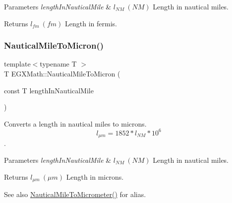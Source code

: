\begin{DoxyParams}{Parameters}
{\em length\+In\+Nautical\+Mile} & $ l_{NM}\ (NM)$ Length in nautical miles. \\
\hline
\end{DoxyParams}
\begin{DoxyReturn}{Returns}
$ l_{fm}\ (fm)$ Length in fermis. 
\end{DoxyReturn}
\mbox{\label{group___e_g_x_math-_conversions-_length_conversions-_non-_s_i-_nautical_mile-_non-_s_i_gad80a4f8f82660ad19a420e55bfb33447}} 
\subsubsection{\texorpdfstring{Nautical\+Mile\+To\+Micron()}{NauticalMileToMicron()}}
{\footnotesize\ttfamily template$<$typename T $>$ \\
T E\+G\+X\+Math\+::\+Nautical\+Mile\+To\+Micron (\begin{DoxyParamCaption}\item[{const T}]{length\+In\+Nautical\+Mile }\end{DoxyParamCaption})}



Converts a length in nautical miles to microns. \[ l_{\mu m}=1852 * l_{NM} * 10^{6} \]. 


\begin{DoxyParams}{Parameters}
{\em length\+In\+Nautical\+Mile} & $ l_{NM}\ (NM)$ Length in nautical miles. \\
\hline
\end{DoxyParams}
\begin{DoxyReturn}{Returns}
$ l_{\mu m}\ (\mu m)$ Length in microns. 
\end{DoxyReturn}
\begin{DoxySeeAlso}{See also}
\mbox{\hyperlink{group___e_g_x_math-_conversions-_length_conversions-_non-_s_i-_nautical_mile-_s_i_ga8ce271a279676a3461dddc59c6a9720b}{Nautical\+Mile\+To\+Micrometer()}} for alias. 
\end{DoxySeeAlso}
\mbox{\label{group___e_g_x_math-_conversions-_length_conversions-_non-_s_i-_nautical_mile-_non-_s_i_ga17cfe98568d00c2e0b1c0b5d19f1b34e}} 

